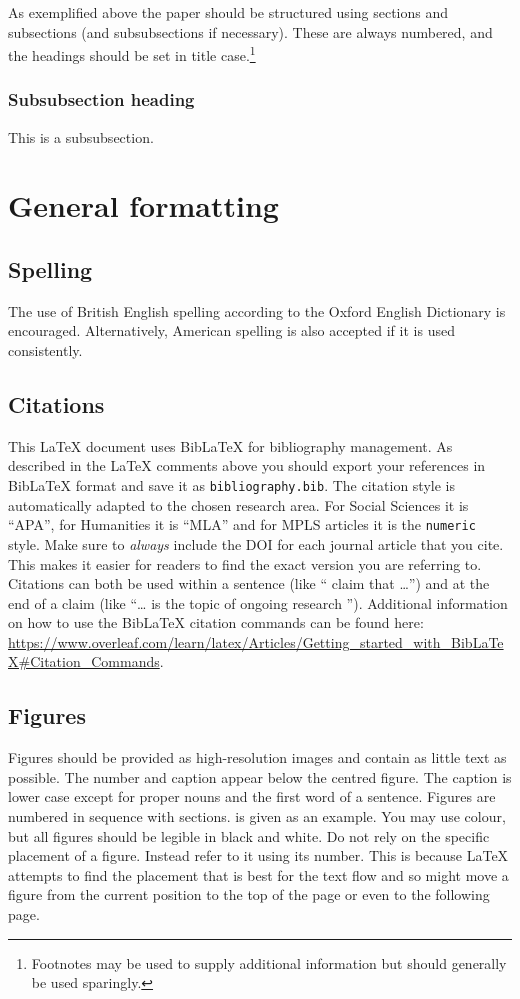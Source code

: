 \documentclass[area=socialsciences,review]{scararticle}
\begin{document}
As exemplified above the paper should be structured using sections and subsections (and subsubsections if necessary).
These are always numbered, and the headings should be set in title case.\footnote{Footnotes may be used to supply additional information but should generally be used sparingly.}

\subsubsection{Subsubsection heading}
This is a subsubsection.

\section{General formatting}

\subsection{Spelling}
The use of British English spelling according to the Oxford English Dictionary is encouraged. Alternatively, American spelling is also accepted if it is used consistently.

\subsection{Citations}
This \LaTeX{} document uses BibLaTeX for bibliography management.
As described in the \LaTeX{} comments above you should export your references in BibLaTeX format and save it as \verb|bibliography.bib|.
The citation style is automatically adapted to the chosen research area.
For Social Sciences it is “APA”, for Humanities it is “MLA” and for MPLS articles it is the \verb|numeric| style.
Make sure to \emph{always} include the DOI for each journal article that you cite.
This makes it easier for readers to find the exact version you are referring to.
Citations can both be used within a sentence (like “\textcite[p. 12]{erdHos1960evolution} claim that …”) and at the end of a claim (like “… is the topic of ongoing research \parencite{faust_microbial_2012}”).
Additional information on how to use the BibLaTeX citation commands can be found here: \url{https://www.overleaf.com/learn/latex/Articles/Getting_started_with_BibLaTeX#Citation_Commands}.

\subsection{Figures}
Figures should be provided as high-resolution images and contain as little text as possible.
The number and caption appear below the centred figure.
The caption is lower case except for proper nouns and the first word of a sentence.
Figures are numbered in sequence with sections.
 is given as an example.
You may use colour, but all figures should be legible in black and white.
Do not rely on the specific placement of a figure. Instead refer to it using its number.
This is because \LaTeX{} attempts to find the placement that is best for the text flow and so might move a figure from the current position to the top of the page or even to the following page.
\end{document}

